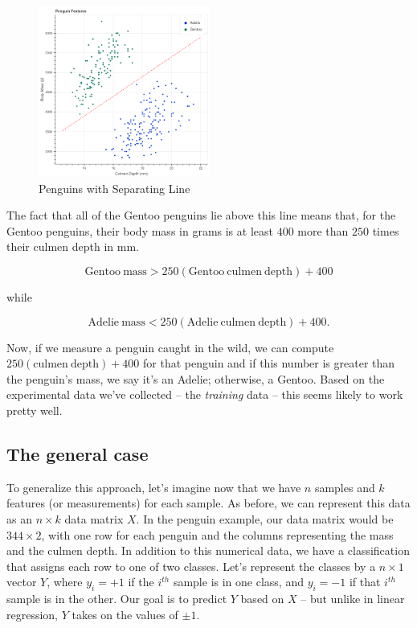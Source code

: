 \documentclass[
]{article}
\begin{document}
\begin{figure}
\hypertarget{fig:penguinsline}{%
\centering
\includegraphics[width=0.5\textwidth,height=\textheight]{../img/penguins_with_line.png}
\caption{Penguins with Separating Line}\label{fig:penguinsline}
}
\end{figure}

The fact that all of the Gentoo penguins lie above this line means that,
for the Gentoo penguins, their body mass in grams is at least \(400\)
more than \(250\) times their culmen depth in mm.

\[
\mathrm{Gentoo\ mass}> 250(\mathrm{Gentoo\ culmen\ depth})+400
\]

while

\[
\mathrm{Adelie\ mass}<250(\mathrm{Adelie\ culmen\ depth})+400.
\]

Now, if we measure a penguin caught in the wild, we can compute
\(250(\mathrm{culmen\ depth})+400\) for that penguin and if this number
is greater than the penguin's mass, we say it's an Adelie; otherwise, a
Gentoo. Based on the experimental data we've collected -- the
\emph{training} data -- this seems likely to work pretty well.

\hypertarget{the-general-case}{%
\subsection{The general case}\label{the-general-case}}

To generalize this approach, let's imagine now that we have \(n\)
samples and \(k\) features (or measurements) for each sample. As before,
we can represent this data as an \(n\times k\) data matrix \(X\). In the
penguin example, our data matrix would be \(344\times 2\), with one row
for each penguin and the columns representing the mass and the culmen
depth. In addition to this numerical data, we have a classification that
assigns each row to one of two classes. Let's represent the classes by a
\(n\times 1\) vector \(Y\), where \(y_{i}=+1\) if the \(i^{th}\) sample
is in one class, and \(y_{i}=-1\) if that \(i^{th}\) sample is in the
other. Our goal is to predict \(Y\) based on \(X\) -- but unlike in
linear regression, \(Y\) takes on the values of \(\pm 1\).
\end{document}
